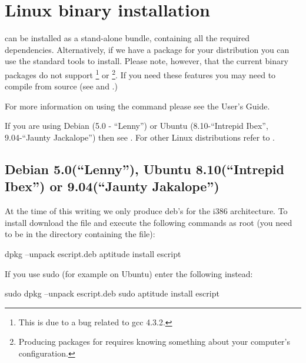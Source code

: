 %
%
%

\section{Linux binary installation}
\label{sec:binlinux}

\esfinley can be installed as a stand-alone bundle, containing all the required dependencies.
Alternatively, if we have a package for your distribution you can use the standard tools to install.
Please note, however, that the current binary packages do not support \openmp\footnote{This is due to a bug related to gcc 4.3.2.} or \mpi\footnote{Producing packages for \mpi requires knowing something about your computer's configuration.}.
If you need these features you may need to compile \esfinley from source (see  and .)

For more information on using the  command please see the User's Guide.

If you are using Debian (5.0 - ``Lenny'') or Ubuntu (8.10-``Intrepid Ibex'', 9.04-``Jaunty Jackalope'') then see .
For other Linux distributions refer to .

\subsection{Debian 5.0(``Lenny''), Ubuntu 8.10(``Intrepid Ibex'') or 9.04(``Jaunty Jakalope'')}\label{sec:debian}

At the time of this writing we only produce deb's for the i386 architecture.
To install \esfinley download the  file and execute the following commands as root (you need to be in the directory containing the file):
\begin{shellCode}
dpkg --unpack escript.deb
aptitude install escript
\end{shellCode}

If you use sudo (for example on Ubuntu) enter the following instead:
\begin{shellCode}
sudo dpkg --unpack escript.deb
sudo aptitude install escript
\end{shellCode}

